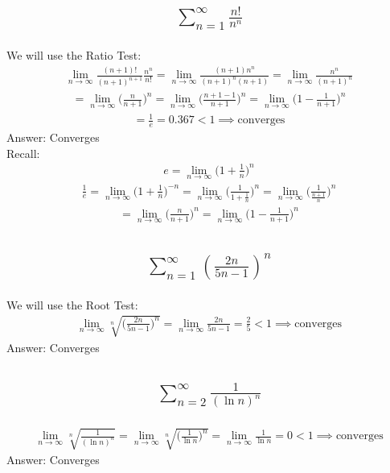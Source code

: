 \documentclass{article}
\begin{document}
\subsection{
	\begin{align*}
		\sum_{n = 1}^\infty \frac{n!}{n^n}
	\end{align*}
}
We will use the Ratio Test:
\begin{align*}
	\lim_{n \to \infty} \frac{(n + 1)!}{(n + 1)^{n + 1}} \frac{n^n}{n!} = \lim_{n \to \infty} \frac{(n + 1) n^n}{(n + 1)^n (n + 1)} = \lim_{n \to \infty} \frac{n^n}{(n + 1)^n}
\end{align*}
\begin{align*}
	= \lim_{n \to \infty} \bigg( \frac{n}{n + 1} \bigg)^n = \lim_{n \to \infty} \bigg( \frac{n + 1 - 1}{n + 1} \bigg)^n = \lim_{n \to \infty} \bigg( 1 - \frac{1}{n + 1} \bigg)^n 
\end{align*}
\begin{align*}
	= \frac{1}{e} = 0.367 < 1 \implies \text{converges}
\end{align*}
Answer: Converges \\[10pt]
Recall:
\begin{align*}
	e = \lim_{n \to \infty} \bigg( 1 + \frac{1}{n} \bigg)^n
\end{align*}
\begin{align*}
	\frac{1}{e} = \lim_{n \to \infty} \bigg( 1 + \frac{1}{n} \bigg)^{-n} = \lim_{n \to \infty} \bigg( \frac{1}{1 + \frac{1}{n}} \bigg)^n = \lim_{n \to \infty} \bigg( \frac{1}{\frac{n + 1}{n}} \bigg)^n
\end{align*}
\begin{align*}
	= \lim_{n \to \infty} \bigg( \frac{n}{n + 1} \bigg)^n = \lim_{n \to \infty} \bigg( 1 - \frac{1}{n + 1} \bigg)^n
\end{align*}

\subsection{
	\begin{align*}
		\sum_{n = 1}^\infty \left( \frac{2n}{5n - 1} \right)^n
	\end{align*}
}
We will use the Root Test:
\begin{align*}
	\lim_{n \to \infty}  \sqrt[n]{\bigg( \frac{2n}{5n - 1} \bigg)^n} = \lim_{n \to \infty} \frac{2n}{5n - 1} = \frac{2}{5} < 1 \implies \text{converges}
\end{align*}
Answer: Converges

\subsection{
	\begin{align*}
		\sum_{n = 2}^\infty \frac{1}{(\ln{n})^n}
	\end{align*}
}
\begin{align*}
	\lim_{n \to \infty}  \sqrt[n]{\frac{1}{(\ln{n})^n}} = \lim_{n \to \infty} \sqrt[n]{\bigg( \frac{1}{\ln{n}} \bigg)^n} = \lim_{n \to \infty} \frac{1}{\ln{n}} = 0 < 1 \implies \text{converges}
\end{align*}
Answer: Converges
\end{document}
